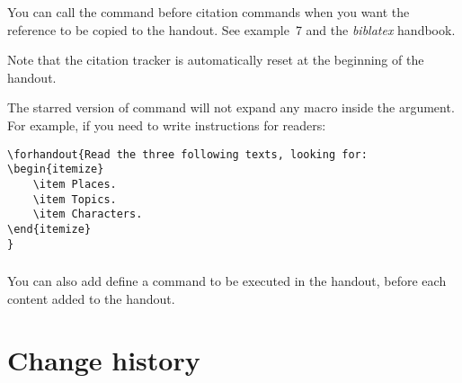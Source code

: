 \documentclass{ltxdockit}[2011/03/25]
\begin{document}
You can call the  command before citation commands when you want the reference to be copied to the handout. See example~7 and the \emph{biblatex} handbook.


Note that the citation tracker is automatically reset at the beginning of the handout.

The starred version of  command will not expand any macro inside the argument. For example, if you need to write instructions for readers:
\begin{verbatim}
\forhandout{Read the three following texts, looking for:
\begin{itemize}
	\item Places.
	\item Topics.
	\item Characters.
\end{itemize}
}
\end{verbatim}
\subsubsection{}\label{forhandout}
You can also add define a  command to be executed in the handout, before each content added to the handout.
\section{Change history}
\end{document}
